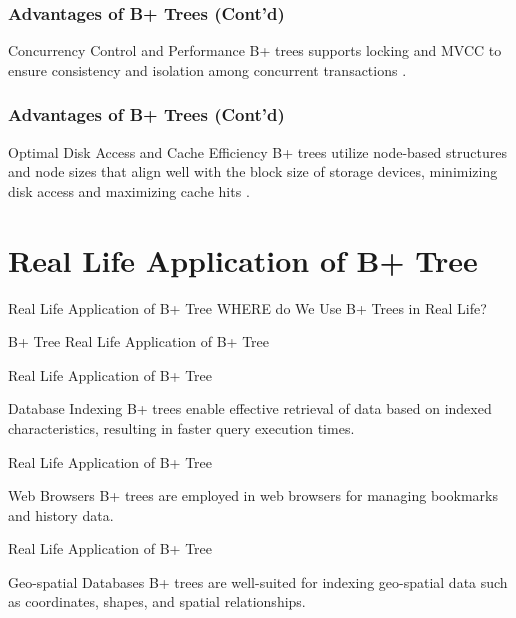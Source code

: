 \documentclass{beamer}
\begin{document}
\begin{frame}
    \frametitle{Advantages of B+ Trees (Cont'd)}
    \begin{block}{Concurrency Control and Performance} 
        B+ trees supports locking and MVCC to ensure consistency and isolation among concurrent transactions \cite{agrawal1987concurrency}.
    \end{block}
\end{frame}

\begin{frame}
    \frametitle{Advantages of B+ Trees (Cont'd)}
    \begin{block}{Optimal Disk Access and Cache Efficiency}
        B+ trees utilize node-based structures and node sizes that align well with the block size of storage devices, minimizing disk access and maximizing cache hits \cite{oneil1992modern}.
    \end{block}
\end{frame}


\section{Real Life Application of B+ Tree}

\begin{frame}{Real Life Application of B+ Tree}
    \centering
    {\huge\alert{WHERE} do We Use B+ Trees in Real Life?}
\end{frame}

\begin{frame}{B+ Tree}
    \centering
    {\huge Real Life Application of B+ Tree}
\end{frame}

\begin{frame}{Real Life Application of B+ Tree}
    \begin{block}{Database Indexing}
        B+ trees enable effective retrieval of data based on indexed characteristics, resulting in faster query execution times.
    \end{block}
\end{frame}

\begin{frame}{Real Life Application of B+ Tree}
    \begin{block}{Web Browsers}
        B+ trees are employed in web browsers for managing bookmarks and history data.
    \end{block}
\end{frame}

\begin{frame}{Real Life Application of B+ Tree}
    \begin{block}{Geo-spatial Databases}
        B+ trees are well-suited for indexing geo-spatial data such as coordinates, shapes, and spatial relationships.
    \end{block}
\end{frame}
\end{document}
